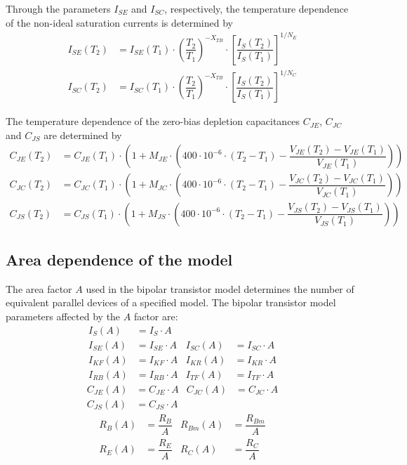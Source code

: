 Through the parameters $I_{SE}$ and $I_{SC}$, respectively, the
temperature dependence of the non-ideal saturation currents is
determined by
\begin{align}
I_{SE}\left(T_2\right) &= I_{SE}\left(T_1\right)\cdot \left(\dfrac{T_2}{T_1}\right)^{-X_{TB}} \cdot \left[\dfrac{I_S\left(T_2\right)}{I_S\left(T_1\right)}\right]^{1/N_E}\\
I_{SC}\left(T_2\right) &= I_{SC}\left(T_1\right)\cdot \left(\dfrac{T_2}{T_1}\right)^{-X_{TB}} \cdot \left[\dfrac{I_S\left(T_2\right)}{I_S\left(T_1\right)}\right]^{1/N_C}
\end{align}

The temperature dependence of the zero-bias depletion capacitances
$C_{JE}$, $C_{JC}$ and $C_{JS}$ are determined by
\begin{align}
C_{JE}\left(T_2\right) &= C_{JE}\left(T_1\right)\cdot\left(1 + M_{JE}\cdot\left(400\cdot 10^{-6} \cdot\left(T_2 - T_1\right) - \dfrac{V_{JE}\left(T_2\right) - V_{JE}\left(T_1\right)}{V_{JE}\left(T_1\right)}\right)\right)\\
C_{JC}\left(T_2\right) &= C_{JC}\left(T_1\right)\cdot\left(1 + M_{JC}\cdot\left(400\cdot 10^{-6} \cdot\left(T_2 - T_1\right) - \dfrac{V_{JC}\left(T_2\right) - V_{JC}\left(T_1\right)}{V_{JC}\left(T_1\right)}\right)\right)\\
C_{JS}\left(T_2\right) &= C_{JS}\left(T_1\right)\cdot\left(1 + M_{JS}\cdot\left(400\cdot 10^{-6} \cdot\left(T_2 - T_1\right) - \dfrac{V_{JS}\left(T_2\right) - V_{JS}\left(T_1\right)}{V_{JS}\left(T_1\right)}\right)\right)
\end{align}

\subsection{Area dependence of the model}

The area factor $A$ used in the bipolar transistor model determines
the number of equivalent parallel devices of a specified model.  The
bipolar transistor model parameters affected by the $A$ factor are:
\begin{align}
I_S\left(A\right) &= I_S\cdot A\\
I_{SE}\left(A\right) &= I_{SE}\cdot A & I_{SC}\left(A\right) &= I_{SC}\cdot A\\
I_{KF}\left(A\right) &= I_{KF}\cdot A & I_{KR}\left(A\right) &= I_{KR}\cdot A\\
I_{RB}\left(A\right) &= I_{RB}\cdot A & I_{TF}\left(A\right) &= I_{TF}\cdot A
\end{align}
\begin{align}
C_{JE}\left(A\right) &= C_{JE}\cdot A & C_{JC}\left(A\right) &= C_{JC}\cdot A\\
C_{JS}\left(A\right) &= C_{JS}\cdot A
\end{align}
\begin{align}
R_{B}\left(A\right) &= \dfrac{R_{B}}{A} & R_{Bm}\left(A\right) &= \dfrac{R_{Bm}}{A}\\
R_{E}\left(A\right) &= \dfrac{R_{E}}{A} & R_{C}\left(A\right) &= \dfrac{R_{C}}{A}
\end{align}


